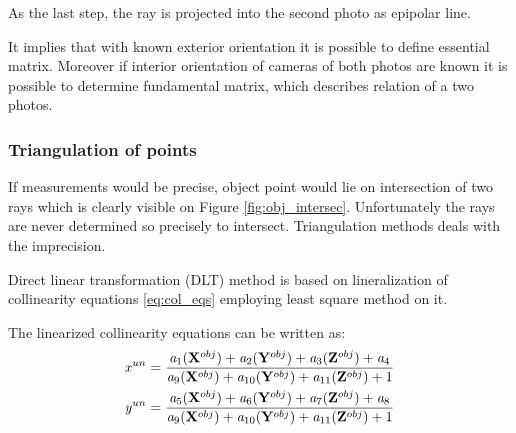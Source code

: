 \documentclass[a4paper,12pt]{article}
\newcommand{\evect}[1]{
{\bf #1}
}
\newcommand{\escal}[1]{
{\it #1}
}
\begin{document}
As the last step, the ray is projected into the second photo as epipolar line.


It implies that with known exterior orientation it is possible to define essential matrix. 
Moreover if interior orientation of cameras of both photos are known it is possible to determine fundamental matrix,
which describes relation of a two photos.

\subsubsection{Triangulation of points}
\label{eq:triang}

If measurements would be precise, object point 
would lie on intersection of two rays which is clearly visible on 
 Figure \ref{fig:obj_intersec}. Unfortunately the rays are never determined so precisely to intersect.
Triangulation methods deals with the imprecision.  

Direct linear transformation (DLT) method  is based 
on lineralization of collinearity equations \eqref{eq:col_eqs}
employing least square method on it.

The linearized collinearity equations can be written as:  
\begin{equation}
\label{eq:col_eqs}
\begin{split}
&\escal{x}^{un} = \frac{\escal{a}_{1}(\evect{X}^{obj}) + 
                                  \escal{a}_{2}(\evect{Y}^{obj}) + 
                                  \escal{a}_{3}(\evect{Z}^{obj}) +
                                  \escal{a}_{4}
                                  }{
				  \escal{a}_{9}(\evect{X}^{obj}) + 
                                  \escal{a}_{10}(\evect{Y}^{obj}) + 
                                  \escal{a}_{11}(\evect{Z}^{obj}) +
                                   1  
                                  } \\
&\escal{y}^{un} = \frac{\escal{a}_{5}(\evect{X}^{obj}) + 
                                  \escal{a}_{6}(\evect{Y}^{obj}) + 
                                  \escal{a}_{7}(\evect{Z}^{obj}) +                                 
                                  \escal{a}_{8}
                                  }{
				  \escal{a}_{9}(\evect{X}^{obj}) + 
                                  \escal{a}_{10}(\evect{Y}^{obj}) + 
                                  \escal{a}_{11}(\evect{Z}^{obj}) +    
                                  1
                                  }
\end{split}
\end{equation}
 
\end{document}
